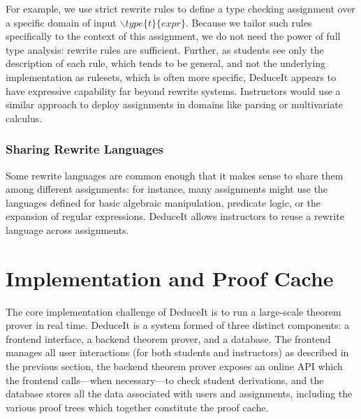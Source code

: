 \documentclass{sigchi}
\begin{document}
For example, we use strict rewrite rules to define a type checking assignment over a specific domain of input $\backslash{}type\{t\}\{expr\}$. Because we tailor such rules specifically to the context of this assignment, we do not need the power of full type analysis: rewrite rules are sufficient. Further, as students see only the description of each rule, which tends to be general, and not the underlying implementation as rulesets, which is often more specific, DeduceIt appears to have expressive capability far beyond rewrite systems. Instructors would use a similar approach to deploy assignments in domains like parsing or multivariate calculus.    %


\subsubsection{Sharing Rewrite Languages}
Some rewrite languages are common enough that it makes sense to share them among different assignments: for instance, many assignments might use the languages defined for basic algebraic manipulation, predicate logic, or the expansion of regular expressions. DeduceIt allows instructors to reuse a rewrite language across assignments.



\section{Implementation and Proof Cache}
The core implementation challenge of DeduceIt is to run a large-scale theorem prover in real time. DeduceIt is a system formed of three distinct components: a frontend interface, a backend theorem prover, and a database. The frontend manages all user interactions (for both students and instructors) as described in the previous section, the backend theorem prover exposes an online API which the frontend calls---when necessary---to check student derivations, and the database stores all the data associated with users and assignments, including the various proof trees which together constitute the proof cache. %
\end{document}
